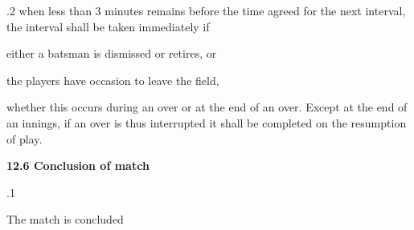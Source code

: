 \documentclass[12pt]{article}
\begin{document}
\vspace{\baselineskip}
\begin{adjustwidth}{0.5in}{0.24in}
{\fontsize{9pt}{10.8pt}.2 \tabto{0.49in} when less than 3 minutes remains before the time agreed for the next interval, the interval shall be taken immediately if\par}\par

\end{adjustwidth}


\vspace{\baselineskip}
\begin{adjustwidth}{0.5in}{0.0in}
{\fontsize{9pt}{10.8pt}\selectfont either a batsman is dismissed or retires, or\par}\par

\end{adjustwidth}


\vspace{\baselineskip}
\begin{adjustwidth}{0.5in}{0.0in}
{\fontsize{9pt}{10.8pt}\selectfont the players have occasion to leave the field,\par}\par

\end{adjustwidth}


\vspace{\baselineskip}
\begin{adjustwidth}{0.5in}{0.28in}
{\fontsize{9pt}{10.8pt}\selectfont whether this occurs during an over or at the end of an over. Except at the end of an innings, if an over is thus interrupted it shall be completed on the resumption of play.\par}\par

\end{adjustwidth}


\vspace{\baselineskip}
{\fontsize{11pt}{13.2pt}\selectfont \textbf{12.6 \tabto{0.47in} Conclusion of match}\par}\par


\vspace{\baselineskip}
{\fontsize{9pt}{10.8pt}.1 \tabto{0.49in} {\fontsize{8pt}{9.6pt}\selectfont The match is concluded\par}\par}\par
\end{document}
